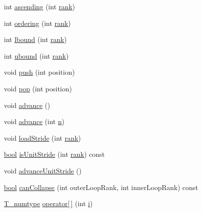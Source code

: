 \begin{DoxyCompactItemize}
\item 
int \hyperlink{class__bz__FunctorExpr2_a1a8fe7b7ae53f92d712db31dfc50d589}{ascending} (int \hyperlink{class__bz__FunctorExpr2_a616c1f8074580cb40a382bd2344319a2}{rank})
\item 
int \hyperlink{class__bz__FunctorExpr2_a50658ed5e1f6e20ec7f6779bd77af4df}{ordering} (int \hyperlink{class__bz__FunctorExpr2_a616c1f8074580cb40a382bd2344319a2}{rank})
\item 
int \hyperlink{class__bz__FunctorExpr2_a7102133d40e2ca6695479af482680fda}{lbound} (int \hyperlink{class__bz__FunctorExpr2_a616c1f8074580cb40a382bd2344319a2}{rank})
\item 
int \hyperlink{class__bz__FunctorExpr2_ac41ff7430d8e3aeb7003dc8fb9f5f807}{ubound} (int \hyperlink{class__bz__FunctorExpr2_a616c1f8074580cb40a382bd2344319a2}{rank})
\item 
void \hyperlink{class__bz__FunctorExpr2_adc887bec6b40ce995e423da734dec8ca}{push} (int position)
\item 
void \hyperlink{class__bz__FunctorExpr2_a98fbaa6b209bbbdb0755648ec082292b}{pop} (int position)
\item 
void \hyperlink{class__bz__FunctorExpr2_a138a0425dc9020e93fd6bfe7d0bd8ca5}{advance} ()
\item 
void \hyperlink{class__bz__FunctorExpr2_a636ffd5135d91c31302213f890aae74c}{advance} (int \hyperlink{indexexpr_8h_ab427e2e2b4d6cec55fa088ea2a692ace}{n})
\item 
void \hyperlink{class__bz__FunctorExpr2_ab2e3718c75ca52da2c93e2165a4bd6e9}{load\+Stride} (int \hyperlink{class__bz__FunctorExpr2_a616c1f8074580cb40a382bd2344319a2}{rank})
\item 
\hyperlink{compiler_8h_abb452686968e48b67397da5f97445f5b}{bool} \hyperlink{class__bz__FunctorExpr2_abeca030aabc71cb614c8ffd530275659}{is\+Unit\+Stride} (int \hyperlink{class__bz__FunctorExpr2_a616c1f8074580cb40a382bd2344319a2}{rank}) const 
\item 
void \hyperlink{class__bz__FunctorExpr2_af78fff3acfaa111387303affdaba613a}{advance\+Unit\+Stride} ()
\item 
\hyperlink{compiler_8h_abb452686968e48b67397da5f97445f5b}{bool} \hyperlink{class__bz__FunctorExpr2_aa81f85f8823ade958e69138c446dfed0}{can\+Collapse} (int outer\+Loop\+Rank, int inner\+Loop\+Rank) const 
\item 
\hyperlink{class__bz__FunctorExpr2_a72c49dc29bb54d045667666e72ea96a6}{T\+\_\+numtype} \hyperlink{class__bz__FunctorExpr2_a9b5f6e60d1609a7b19662ea6b5cfacc2}{operator\mbox{[}$\,$\mbox{]}} (int \hyperlink{indexexpr_8h_aabd77643995707c185e95c8cb2782c81}{i})

\end{DoxyCompactItemize}
